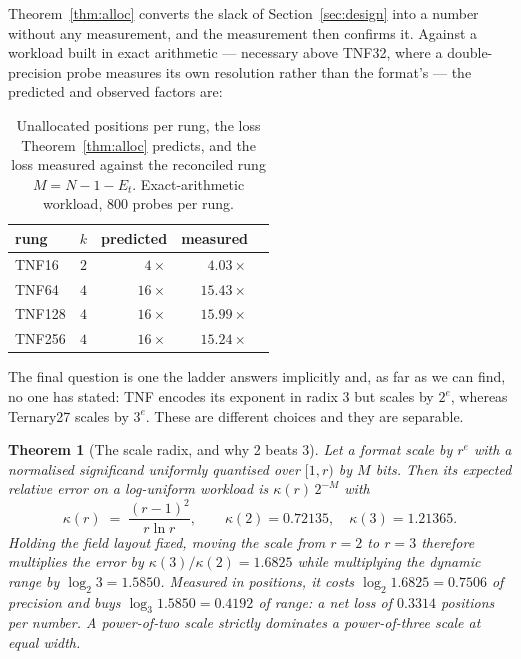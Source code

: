 \documentclass[11pt]{article}
\newtheorem{theorem}{Theorem}
\theoremstyle{definition}
\begin{document}
Theorem~\ref{thm:alloc} converts the slack of Section~\ref{sec:design} into a
number without any measurement, and the measurement then confirms it. Against a
workload built in exact arithmetic --- necessary above TNF32, where a
double-precision probe measures its own resolution rather than the format's ---
the predicted and observed factors are:

\begin{table}[t]\centering
\caption{Unallocated positions per rung, the loss Theorem~\ref{thm:alloc}
predicts, and the loss measured against the reconciled rung
$M = N - 1 - E_t$. Exact-arithmetic workload, 800 probes per rung.}
\label{tab:alloc}
\begin{tabular}{lrrrr}
\toprule
rung & $k$ & predicted & measured \\
\midrule
TNF16  & $2$ & $4\times$  & $4.03\times$  \\
TNF64  & $4$ & $16\times$ & $15.43\times$ \\
TNF128 & $4$ & $16\times$ & $15.99\times$ \\
TNF256 & $4$ & $16\times$ & $15.24\times$ \\
\bottomrule
\end{tabular}
\end{table}

The final question is one the ladder answers implicitly and, as far as we can
find, no one has stated: TNF encodes its exponent in radix 3 but scales by
$2^{e}$, whereas Ternary27 scales by $3^{e}$. These are different choices and
they are separable.

\begin{theorem}[The scale radix, and why 2 beats 3]
\label{thm:scaleradix}
Let a format scale by $r^{e}$ with a normalised significand uniformly quantised
over $[1, r)$ by $M$ bits. Then its expected relative error on a log-uniform
workload is $\kappa(r)\,2^{-M}$ with
\[
\kappa(r) \;=\; \frac{(r-1)^{2}}{r\ln r},
\qquad \kappa(2) = 0.72135,\quad \kappa(3) = 1.21365 .
\]
Holding the field layout fixed, moving the scale from $r=2$ to $r=3$ therefore
multiplies the error by $\kappa(3)/\kappa(2) = 1.6825$ while multiplying the
dynamic range by $\log_2 3 = 1.5850$. Measured in positions, it costs
$\log_2 1.6825 = 0.7506$ of precision and buys $\log_3 1.5850 = 0.4192$ of range:
a net loss of $0.3314$ positions per number. A power-of-two scale strictly
dominates a power-of-three scale at equal width.
\end{theorem}
\end{document}
